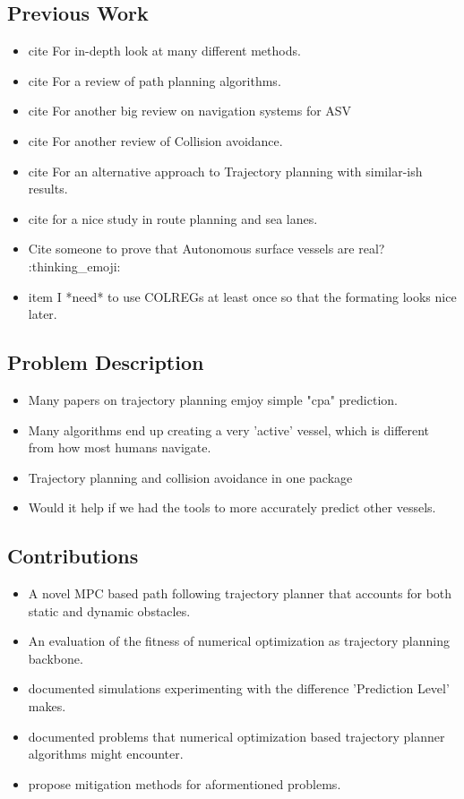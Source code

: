 \subsection{Previous Work}
\begin{itemize}
    \item cite \cite{loe2007collision} For in-depth look at many different methods.
    \item cite \cite{vagale2021path} For a review of path planning algorithms.
    \item cite \cite{zhang2021collision} For another big review on navigation systems for ASV
    \item cite \cite{huang2020ship} For another review of Collision avoidance.
    \item cite \cite{park2020social} For an alternative approach to Trajectory planning with similar-ish results.
    \item cite \cite{vestad2019automatic} for a nice study in route planning and sea lanes.
    \item Cite someone to prove that Autonomous surface vessels are real? :thinking\_emoji:
    \item item I *need* to use \gls{COLREGs} at least once so that the formating looks nice later.
\end{itemize}

\subsection{Problem Description}
\begin{itemize}
    \item Many papers on trajectory planning emjoy simple "cpa" prediction.
    \item Many algorithms end up creating a very 'active' vessel, which is different from how most humans navigate.
    \item Trajectory planning and collision avoidance in one package
    \item Would it help if we had the tools to more accurately predict other vessels.
\end{itemize}

\subsection{Contributions}
\begin{itemize}
    \item A novel MPC based path following trajectory planner that accounts for both static and dynamic obstacles.
    \item An evaluation of the fitness of numerical optimization as trajectory planning backbone.
    \item documented simulations experimenting with the difference 'Prediction Level' makes.
    \item documented problems that numerical optimization based trajectory planner algorithms might encounter.
    \item propose mitigation methods for aformentioned problems.
\end{itemize}

